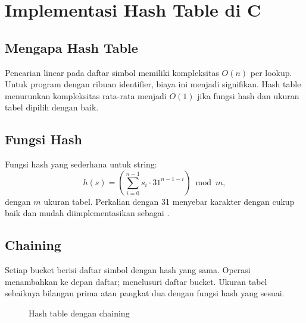 \section{Implementasi Hash Table di C}
\label{sec:ch15-hash}

\subsection{Mengapa Hash Table}

Pencarian linear pada daftar simbol memiliki kompleksitas
\(O(n)\) per lookup. Untuk program dengan ribuan identifier, biaya
ini menjadi signifikan. Hash table menurunkan kompleksitas rata-rata
menjadi \(O(1)\) jika fungsi hash dan ukuran tabel dipilih dengan
baik.

\subsection{Fungsi Hash}

Fungsi hash yang sederhana untuk string:
\[
h(s) = \left(\sum_{i=0}^{n-1} s_i \cdot 31^{n-1-i}\right)
\bmod m,
\]
dengan \(m\) ukuran tabel. Perkalian dengan 31 menyebar karakter
dengan cukup baik dan mudah diimplementasikan sebagai
.

\subsection{Chaining}

Setiap bucket berisi daftar simbol dengan hash yang sama. Operasi
 menambahkan ke depan daftar;  menelusuri
daftar bucket. Ukuran tabel sebaiknya bilangan prima atau pangkat
dua dengan fungsi hash yang sesuai.

\begin{figure}[H]
\centering
{}
\caption{Hash table dengan chaining}
\label{fig:ch15-hash}
\end{figure}

